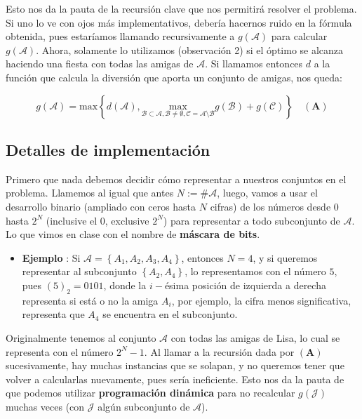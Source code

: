 Esto nos da la pauta de la recursión clave que nos permitirá resolver el problema. Si uno lo ve con ojos más implementativos, debería hacernos ruido en la fórmula obtenida, pues estaríamos llamando recursivamente a $g(\mathcal{A})$ para calcular $g(\mathcal{A})$. Ahora, solamente lo utilizamos (observación 2) si el óptimo se alcanza haciendo una fiesta con todas las amigas de $\mathcal{A}$. Si llamamos entonces $d$ a la función que calcula la diversión que aporta un conjunto de amigas, nos queda:

$$ \boxed{g(\mathcal{A}) =  \text{max} \left \{ d(\mathcal{A}),\underset{\mathcal{B} \subset \mathcal{A}, \mathcal{B} \neq \emptyset, \mathcal{C} = \mathcal{A} \setminus \mathcal{B}}{\text{max}} g(\mathcal{B}) + g(\mathcal{C}) \right \} } \quad  (\mathbf{A}) $$


\subsection*{Detalles de implementación}

Primero que nada debemos decidir cómo representar a nuestros conjuntos en el problema. Llamemos al igual que antes $ N := \# \mathcal{A}$, luego, vamos a usar el desarrollo binario (ampliado con ceros hasta $N$ cifras) de los números desde $0$ hasta $2^N$ (inclusive el $0$, exclusive $2^N$) para representar a todo subconjunto de $\mathcal{A}$. Lo que vimos en clase con el nombre de \textbf{máscara de bits}.

\begin{itemize}
	\item \textbf{Ejemplo} : Si $\mathcal{A} = \left \{ A_1, A_2, A_3, A_4 \right \}$, entonces $ N = 4$, y si queremos representar al subconjunto $ \left \{ A_2, A_4 \right \}$, lo representamos con el número $5$, pues $(5)_2 = 0101$, donde la $i-$ésima posición de izquierda a derecha representa si está o no la amiga $A_i$, por ejemplo, la cifra menos significativa, representa que $A_4$ se encuentra en el subconjunto.
\end{itemize}

Originalmente tenemos al conjunto $\mathcal{A}$ con todas las amigas de Lisa, lo cual se representa con el número $2^N-1$. Al llamar a la recursión dada por $(\mathbf{A})$ sucesivamente, hay muchas instancias que se solapan, y no queremos tener que volver a calcularlas nuevamente, pues sería ineficiente. Esto nos da la pauta de que podemos utilizar \textbf{programación dinámica} para no recalcular $g(\mathcal{J})$ muchas veces (con $\mathcal{J}$ algún subconjunto de $\mathcal{A}$).

